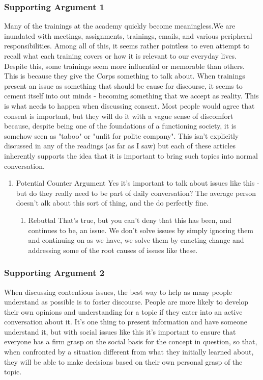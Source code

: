 \documentclass[11pt]{article}
\begin{document}
\subsubsection{Supporting Argument 1}
\label{sec:orgf47cdc8}
Many of the trainings at the academy quickly become meaningless.We are inundated with meetings, assignments, trainings, emails, and various peripheral responsibilities. Among all of this, it seems rather pointless to even attempt to recall what each training covers or how it is relevant to our everyday lives. Despite this, some trainings seem more influential or memorable than others. This is because they give the Corps something to talk about. When trainings present an issue as something that should be cause for discourse, it seems to cement itself into out minds - becoming something that we accept as reality. This is what needs to happen when discussing consent. Most people would agree that consent is important, but they will do it with a vague sense of discomfort because, despite being one of the foundations of a functioning society, it is somehow seen as "taboo" or "unfit for polite company". This isn't explicitly discussed in any of the readings (as far as I saw) but each of these articles inherently supports the idea that it is important to bring such topics into normal conversation.

\begin{enumerate}
\item Potential Counter Argument
\label{sec:org8eab283}
Yes it's important to talk about issues like this - but do they really need to be part of daily conversation? The average person doesn't alk about this sort of thing, and the do perfectly fine. 

\begin{enumerate}
\item Rebuttal
\label{sec:org3d99a29}
That's true, but you can't deny that this has been, and continues to be, an issue. We don't solve issues by simply ignoring them and continuing on as we have, we solve them by enacting change and addressing some of the root causes of issues like these.
\end{enumerate}
\end{enumerate}

\subsubsection{Supporting Argument 2}
\label{sec:org9c3413e}
When discussing contentious issues, the best way to help as many people understand as possible is to foster discourse. People are more likely to develop their own opinions and understanding for a topic if they enter into an active conversation about it. It's one thing to present information and have someone understand it, but with social issues like this it's important to ensure that everyone has a firm grasp on the social basis for the concept in question, so that, when confronted by a situation different from what they initially learned about, they will be able to make decisions based on their own personal grasp of the topic. 
\end{document}
